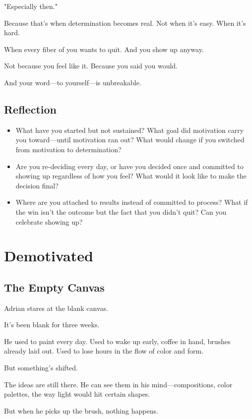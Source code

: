 \documentclass[11pt,twoside]{book}
\begin{document}
"Especially then."

Because that's when determination becomes real. Not when it's easy. When it's hard.

When every fiber of you wants to quit. And you show up anyway.

Not because you feel like it. Because you said you would.

And your word—to yourself—is unbreakable.

\section*{Reflection}

\begin{itemize}
\item What have you started but not sustained? What goal did motivation carry you toward—until motivation ran out? What would change if you switched from motivation to determination?
\item Are you re-deciding every day, or have you decided once and committed to showing up regardless of how you feel? What would it look like to make the decision final?
\item Where are you attached to results instead of committed to process? What if the win isn't the outcome but the fact that you didn't quit? Can you celebrate showing up?
\end{itemize}

\chapter{Demotivated}

\section*{The Empty Canvas}

Adrian stares at the blank canvas.

It's been blank for three weeks.

He used to paint every day. Used to wake up early, coffee in hand, brushes already laid out. Used to lose hours in the flow of color and form.

But something's shifted.

The ideas are still there. He can see them in his mind—compositions, color palettes, the way light would hit certain shapes.

But when he picks up the brush, nothing happens.
\end{document}
